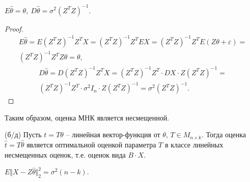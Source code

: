 \begin{proposition}
    $\displaystyle E\hat{\theta } =\theta ,\ D\hat{\theta } =\sigma ^{2}\left( Z^{T} Z\right)^{-1}$.
\end{proposition}
\begin{proof}
    \begin{gather*}
        E\hat{\theta } =E\left( Z^{T} Z\right)^{-1} Z^{T} X=\left( Z^{T} Z\right)^{-1} Z^{T} EX=\left( Z^{T} Z\right)^{-1} Z^{T} E( Z\theta +\varepsilon ) =\\
        \left( Z^{T} Z\right)^{-1} Z^{T} Z\theta =\theta ,
    \end{gather*}
    \begin{gather*}
        D\hat{\theta } =D\left( Z^{T} Z\right)^{-1} Z^{T} X=\left( Z^{T} Z\right)^{-1} Z^{T} \cdotp DX\cdotp Z\left( Z^{T} Z\right)^{-1} =\\
        \left( Z^{T} Z\right)^{-1} Z^{T} \cdotp \sigma ^{2} I_{n} \cdotp Z\left( Z^{T} Z\right)^{-1} =\sigma ^{2}\left( Z^{T} Z\right)^{-1} .
    \end{gather*}
\end{proof}
\begin{note}
    Таким образом, оценка МНК является несмещенной.
\end{note}
\begin{theorem}
    (б/д) Пусть $\displaystyle t=T\theta $ -- линейная вектор-функция от $\displaystyle \theta $, $\displaystyle T\in M_{n\times k}$. Тогда оценка $\displaystyle \hat{t} =T\hat{\theta }$ является оптимальной оценкой параметра $\displaystyle T$ в классе линейных несмещенных оценок, т.е. оценок вида $\displaystyle B\cdotp X$.
\end{theorem}
\begin{lemma}
    $\displaystyle E\Vert X-Z\hat{\theta }\Vert _{2}^{2} =\sigma ^{2}( n-k)$.
\end{lemma}
